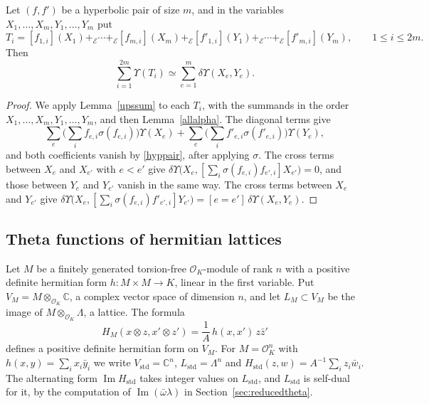 \begin{proposition}\label{hypshape}
Let $(f,f')$ be a hyperbolic pair of size $m$, and in the variables $X_1,\dots,X_m,Y_1,\dots,Y_m$ put
\[
T_i=[f_{1,i}](X_1)+_{\mathcal E}\cdots+_{\mathcal E}[f_{m,i}](X_m)+_{\mathcal E}[f'_{1,i}](Y_1)+_{\mathcal E}\cdots+_{\mathcal E}[f'_{m,i}](Y_m),\qquad1\le i\le2m.
\]
Then
\[
\sum_{i=1}^{2m}\Upsilon(T_i)\simeq\sum_{e=1}^m\delta\Upsilon(X_e,Y_e).
\]
\end{proposition}

\begin{proof}
We apply Lemma~\ref{upssum} to each $T_i$, with the summands in the order $X_1,\dots,X_m,Y_1,\dots,Y_m$, and then Lemma~\ref{allalpha}. The diagonal terms give
\[
\sum_e\Big(\sum_if_{e,i}\sigma(f_{e,i})\Big)\Upsilon(X_e)+\sum_e\Big(\sum_if'_{e,i}\sigma(f'_{e,i})\Big)\Upsilon(Y_e),
\]
and both coefficients vanish by \eqref{hyppair}, after applying $\sigma$. The cross terms between $X_e$ and $X_{e'}$ with $e<e'$ give $\delta\Upsilon\big(X_e,[\sum_i\sigma(f_{e,i})f_{e',i}]X_{e'}\big)=0$, and those between $Y_e$ and $Y_{e'}$ vanish in the same way. The cross terms between $X_e$ and $Y_{e'}$ give $\delta\Upsilon\big(X_e,[\sum_i\sigma(f_{e,i})f'_{e',i}]Y_{e'}\big)=[e=e']\,\delta\Upsilon(X_e,Y_e)$.
\end{proof}

\subsection{Theta functions of hermitian lattices}\label{sec:hermtheta}

Let $M$ be a finitely generated torsion-free $\mathcal O_K$-module of rank $n$ with a positive definite hermitian form $h\colon M\times M\to K$, linear in the first variable. Put $V_M=M\otimes_{\mathcal O_K}\mathbb C$, a complex vector space of dimension $n$, and let $L_M\subset V_M$ be the image of $M\otimes_{\mathcal O_K}\Lambda$, a lattice. The formula
\[
H_M(x\otimes z,x'\otimes z')=\frac1A\,h(x,x')\,z\bar z'
\]
defines a positive definite hermitian form on $V_M$. For $M=\mathcal O_K^n$ with $h(x,y)=\sum_ix_i\bar y_i$ we write $V_{\mathrm{std}}=\mathbb C^n$, $L_{\mathrm{std}}=\Lambda^n$ and $H_{\mathrm{std}}(z,w)=A^{-1}\sum_iz_i\bar w_i$. The alternating form $\operatorname{Im}H_{\mathrm{std}}$ takes integer values on $L_{\mathrm{std}}$, and $L_{\mathrm{std}}$ is self-dual for it, by the computation of $\operatorname{Im}(\bar\omega\lambda)$ in Section~\ref{sec:reducedtheta}.

